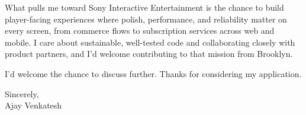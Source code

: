 \documentclass[letterpaper,11pt]{article}
\begin{document}
What pulls me toward Sony Interactive Entertainment is the chance to build player-facing experiences where polish, performance, and reliability matter on every screen, from commerce flows to subscription services across web and mobile. I care about sustainable, well-tested code and collaborating closely with product partners, and I'd welcome contributing to that mission from Brooklyn.

I'd welcome the chance to discuss further. Thanks for considering my application.

\vspace{12pt}
Sincerely, \\
Ajay Venkatesh
\end{document}
